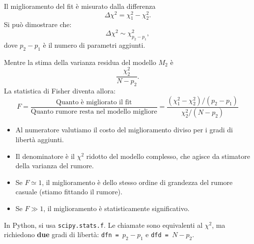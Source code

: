 \documentclass[openany,a4paper,12pt]{book}
\theoremstyle{remark}
\begin{document}
Il miglioramento del fit è misurato dalla differenza
\[
\Delta\chi^2 = \chi_1^2-\chi_2^2.
\]
Si può dimostrare che:
\[
\Delta\chi^2 \sim \chi^2_{p_2-p_1},
\]
dove \(p_2-p_1\) è il numero di parametri aggiunti.

Mentre la stima della varianza residua del modello $M_2$ è
\[
\frac{\chi_2^2}{N-p_2}.
\]
La statistica di Fisher diventa allora:
\begin{equation}
    F = \frac{\text{Quanto è migliorato il fit}}{\text{Quanto rumore resta nel modello migliore}} = \frac{(\chi^2_1 - \chi^2_2) / (p_2 - p_1)}{\chi^2_2 / (N - p_2)}
\end{equation}
\begin{itemize}
    \item Al numeratore valutiamo il costo del miglioramento diviso per i gradi di libertà aggiunti.
    \item Il denominatore è il $\chi^2$ ridotto del modello complesso, che agisce da stimatore della varianza del rumore.
\end{itemize}

\begin{itemize}
    \item Se $F \simeq 1$, il miglioramento è dello stesso ordine di grandezza del rumore casuale (stiamo fittando il rumore).
    \item Se $F \gg 1$, il miglioramento è statisticamente significativo.
\end{itemize}
In Python, si usa \texttt{scipy.stats.f}. Le chiamate sono equivalenti al $\chi^2$, ma richiedono \textbf{due} gradi di libertà: \texttt{dfn = $p_2 - p_1$} e \texttt{dfd = $N - p_2$}.


\begin{center}
\end{center}
\end{document}
